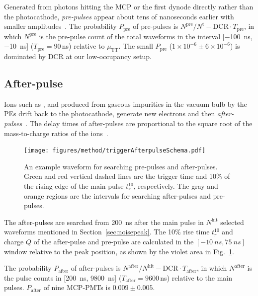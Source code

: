 Generated from photons hitting the MCP or the first dynode directly rather than the photocathode, \emph{pre-pulses} appear about tens of nanoseconds earlier with smaller amplitudes~\cite{JUNOMassTesting}. The probability $P_{\mathrm{pre}}$ of pre-pulses is $N^{\mathrm{pre}}/N^\mathrm{t} - \mathrm{DCR}\cdot T_{\mathrm{pre}}$, in which $N^{\mathrm{pre}}$ is the pre-pulse count of the total waveforms in the interval [\SI{-100}{ns},\SI{-10}{ns}] ($T_{\mathrm{pre}}=90$\,ns) relative to $\mu_{\mathrm{TT}}$. The small $P_{\mathrm{pre}}$ ($1\times10^{-6}\pm6\times10^{-6}$) is dominated by DCR at our low-occupancy setup.

\subsection{After-pulse}
\label{sec:afterpulse}
Ions such as ,  and  produced from gaseous impurities in the vacuum bulb by the PEs drift back to the photocathode, generate new electrons and then \emph{after-pulses}~\cite{JUNOMassTesting,Coates_1973}. The delay times of after-pulses are proportional to the square root of the mass-to-charge ratios of the ions~\cite{XENON1TTesting,Coates_1973,afterpulseTime}. %
\begin{figure}[!htbp]
    \centering
    \texttt{[image: figures/method/triggerAfterpulseSchema.pdf]}
    \caption{An example waveform for searching pre-pulses and after-pulses. Green and red vertical dashed lines are the trigger time and 10\% of the rising edge of the main pulse $t_r^{10}$, respectively. The gray and orange regions are the intervals for searching after-pulses and pre-pulses.}
    \label{fig:afterpulseSchema}
\end{figure}
The after-pulses are searched from \SI{200}{ns} after the main pulse in $N^\mathrm{hit}$ selected waveforms mentioned in Section~\ref{sec:noisepeak}. The 10\% rise time $t_r^{10}$ and charge $Q$ of the after-pulse and pre-pulse are calculated in the $[-\SI{10}{ns},\SI{75}{ns}]$ window relative to the peak position, as shown by the violet area in Fig.~\ref{fig:afterpulseSchema}.

The probability $P_{\mathrm{after}}$ of after-pulses is $N^{\mathrm{after}}/N^\mathrm{hit} - \mathrm{DCR}\cdot T_{\mathrm{after}}$, in which $N^{\mathrm{after}}$ is the pulse counts in [\SI{200}{ns}, \SI{9800}{ns}] ($T_{\mathrm{after}}=9600$\,ns) relative to the main pulses. $P_{\mathrm{after}}$ of nine MCP-PMTs is $0.009\pm0.005$.

